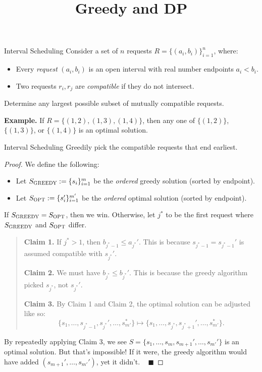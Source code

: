 \title{Greedy and DP}



\begin{problem}{Interval Scheduling}
Consider a set of $n$ requests $R = \{(a_i, b_i)\}_{i = 1}^n$, where:
\begin{itemize}
    \item Every \emph{request} $(a_i, b_i)$ is an open interval with real number endpoints $a_i< b_i$.
    \item Two requests $r_i, r_j$ are \emph{compatible} if they do not intersect.
\end{itemize}
Determine any largest possible subset of mutually compatible requests.
\end{problem}

\textbf{Example.} If $R = \{(1, 2), (1, 3), (1, 4)\}$, then any one of $\{(1, 2)\}$, $\{(1, 3)\}$, or $\{(1, 4)\}$ is an optimal solution.

\begin{solution}{Interval Scheduling}
Greedily pick the compatible requests that end earliest.
\end{solution}

\begin{proof}
We define the following:
\begin{itemize}
    \item Let $S_{\textsc{GREEDY}} := \{s_i\}_{i = 1}^m$ be the \emph{ordered} greedy solution (sorted by endpoint).
    \item Let $S_{\textsc{OPT}} := \{s_i'\}_{i = 1}^{m'}$ be the \emph{ordered} optimal solution (sorted by endpoint).
\end{itemize}
If $S_{\textsc{GREEDY}} = S_{\textsc{OPT}}$, then we win.  Otherwise, let $j^*$ to be the first request where $S_{\textsc{GREEDY}}$ and $S_{\textsc{OPT}}$ differ.
\begin{quote}
    \textbf{Claim 1.} If $j^* > 1$, then $b_{j^* - 1} \leq a_{j^*}'$.  This is because $s_{j^* - 1} = s_{j^* - 1}'$ is assumed compatible with $s_{j^*}'$.

    \textbf{Claim 2.} We must have $b_{j^*} \leq b_{j^*}'$.  This is because the greedy algorithm picked $s_{j^*}$, not $s_{j^*}'$.

    \textbf{Claim 3.} By Claim 1 and Claim 2, the optimal solution can be adjusted like so:
    \[ \{s_1, \dots, s_{j^* - 1}, s_{j^*}', \dots, s_{m'}^*\} \mapsto \{s_1, \dots, s_{j^*}, s_{j^* + 1}', \dots, s_{m'}^*\}. \]
\end{quote}
By repeatedly applying Claim 3, we see $S = \{s_1, \dots, s_m, s_{m + 1}', \dots, s_{m'}'\}$ is an optimal solution.  But that's impossible!  If it were, the greedy algorithm would have added $(s_{m + 1}', \dots, s_{m'}')$, yet it didn't. ~ $\blacksquare$
\end{proof}

